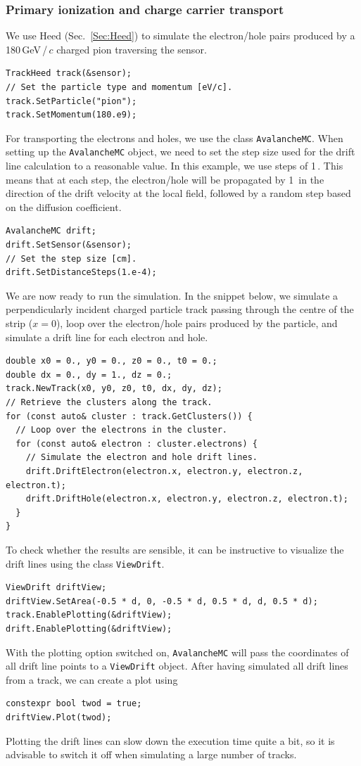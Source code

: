 \subsubsection{Primary ionization and charge carrier transport}

We use Heed (Sec.~\ref{Sec:Heed}) to simulate the electron/hole pairs 
produced by a 180\,GeV\,/\,$c$ charged pion traversing the sensor.
\begin{lstlisting}
TrackHeed track(&sensor);
// Set the particle type and momentum [eV/c].
track.SetParticle("pion");
track.SetMomentum(180.e9);
\end{lstlisting}
For transporting the electrons and holes, we use the class \texttt{AvalancheMC}. 
When setting up the \texttt{AvalancheMC} object, 
we need to set the step size used for the drift line calculation 
to a reasonable value. In this example, we use steps of 1\,. 
This means that at each step, the electron/hole will be propagated by 
1\, in the direction of the drift velocity at the local field, 
followed by a random step based on the diffusion coefficient.
\begin{lstlisting}
AvalancheMC drift;
drift.SetSensor(&sensor);
// Set the step size [cm].
drift.SetDistanceSteps(1.e-4);
\end{lstlisting}
We are now ready to run the simulation. In the snippet below, 
we simulate a perpendicularly incident charged particle track 
passing through the centre of the strip ($x = 0$), 
loop over the electron/hole pairs produced by the particle, 
and simulate a drift line for each electron and hole.
\begin{lstlisting}
double x0 = 0., y0 = 0., z0 = 0., t0 = 0.;
double dx = 0., dy = 1., dz = 0.; 
track.NewTrack(x0, y0, z0, t0, dx, dy, dz);
// Retrieve the clusters along the track.
for (const auto& cluster : track.GetClusters()) {
  // Loop over the electrons in the cluster.
  for (const auto& electron : cluster.electrons) {
    // Simulate the electron and hole drift lines.
    drift.DriftElectron(electron.x, electron.y, electron.z, electron.t);
    drift.DriftHole(electron.x, electron.y, electron.z, electron.t);
  }
}
\end{lstlisting}
To check whether the results are sensible, 
it can be instructive to visualize the drift lines 
using the class \texttt{ViewDrift}.
\begin{lstlisting}
ViewDrift driftView;
driftView.SetArea(-0.5 * d, 0, -0.5 * d, 0.5 * d, d, 0.5 * d);
track.EnablePlotting(&driftView);
drift.EnablePlotting(&driftView);
\end{lstlisting}
With the plotting option switched on, \texttt{AvalancheMC} 
will pass the coordinates of all drift line points 
to a \texttt{ViewDrift} object. 
After having simulated all drift lines from a track, we can create a plot using
\begin{lstlisting}
constexpr bool twod = true;
driftView.Plot(twod);
\end{lstlisting}
Plotting the drift lines can slow down the execution time quite a bit, so it is advisable to switch it off when simulating a large number of tracks.

